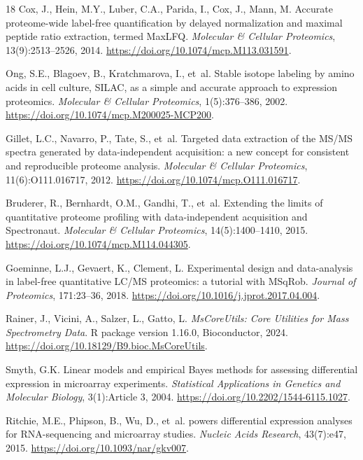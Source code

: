 \documentclass[11pt,twoside,openright]{book}
\begin{document}
\begin{thebibliography}{18}
Cox, J., Hein, M.Y., Luber, C.A., Parida, I., Cox, J., Mann, M.
\newblock Accurate proteome-wide label-free quantification by delayed normalization and maximal peptide ratio extraction, termed {MaxLFQ}.
\newblock \emph{Molecular \& Cellular Proteomics}, 13(9):2513--2526, 2014.
\newblock \url{https://doi.org/10.1074/mcp.M113.031591}.

Ong, S.E., Blagoev, B., Kratchmarova, I., et~al.
\newblock Stable isotope labeling by amino acids in cell culture, {SILAC}, as a simple and accurate approach to expression proteomics.
\newblock \emph{Molecular \& Cellular Proteomics}, 1(5):376--386, 2002.
\newblock \url{https://doi.org/10.1074/mcp.M200025-MCP200}.

Gillet, L.C., Navarro, P., Tate, S., et~al.
\newblock Targeted data extraction of the {MS/MS} spectra generated by data-independent acquisition: a new concept for consistent and reproducible proteome analysis.
\newblock \emph{Molecular \& Cellular Proteomics}, 11(6):O111.016717, 2012.
\newblock \url{https://doi.org/10.1074/mcp.O111.016717}.

Bruderer, R., Bernhardt, O.M., Gandhi, T., et~al.
\newblock Extending the limits of quantitative proteome profiling with data-independent acquisition and {Spectronaut}.
\newblock \emph{Molecular \& Cellular Proteomics}, 14(5):1400--1410, 2015.
\newblock \url{https://doi.org/10.1074/mcp.M114.044305}.

Goeminne, L.J., Gevaert, K., Clement, L.
\newblock Experimental design and data-analysis in label-free quantitative {LC/MS} proteomics: a tutorial with {MSqRob}.
\newblock \emph{Journal of Proteomics}, 171:23--36, 2018.
\newblock \url{https://doi.org/10.1016/j.jprot.2017.04.004}.

Rainer, J., Vicini, A., Salzer, L., Gatto, L.
\newblock \emph{MsCoreUtils: Core Utilities for Mass Spectrometry Data}.
\newblock R package version 1.16.0, Bioconductor, 2024.
\newblock \url{https://doi.org/10.18129/B9.bioc.MsCoreUtils}.

Smyth, G.K.
\newblock Linear models and empirical {Bayes} methods for assessing differential expression in microarray experiments.
\newblock \emph{Statistical Applications in Genetics and Molecular Biology}, 3(1):Article 3, 2004.
\newblock \url{https://doi.org/10.2202/1544-6115.1027}.

Ritchie, M.E., Phipson, B., Wu, D., et~al.
 powers differential expression analyses for {RNA}-sequencing and microarray studies.
\newblock \emph{Nucleic Acids Research}, 43(7):e47, 2015.
\newblock \url{https://doi.org/10.1093/nar/gkv007}.


\end{thebibliography}
\end{document}
